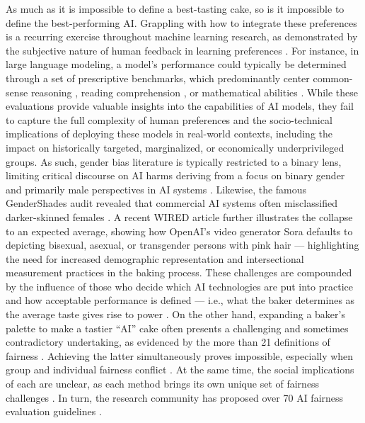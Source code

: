 \documentclass[manuscript,screen,authorversion,nonacm]{acmart}
\begin{document}
As much as it is impossible to define a best-tasting cake, so is it impossible to define the best-performing AI.
Grappling with how to integrate these preferences is a recurring exercise throughout machine learning research, as demonstrated by the subjective nature of human feedback in learning preferences \citep{kirk2024prism}.
For instance, in large language modeling, a model's performance could typically be determined through a set of prescriptive benchmarks, which predominantly center common-sense reasoning \cite{zellers2019hellaswag, ai2:winogrande, talmor-etal-2019-commonsenseqa}, reading comprehension \cite{rajpurkar-etal-2016-squad, clark2019boolq, choi-etal-2018-quac}, or mathematical abilities \cite{cobbe2021gsm8k,lightman2023lets}. 
While these evaluations provide valuable insights into the capabilities of AI models, they fail to capture the full complexity of human preferences and the socio-technical implications of deploying these models in real-world contexts, including the impact on historically targeted, marginalized, or economically underprivileged groups. As such, gender bias literature is typically restricted to a binary lens, limiting critical discourse on AI harms deriving from a focus on binary gender \cite{Queerinai2023, ovalle2024root} and primarily male perspectives in AI systems \cite{ovalle2023m, dev2021harms}.
Likewise, the famous GenderShades audit \cite{Buolamwini2018GenderShades} revealed that commercial AI systems often misclassified darker-skinned females \cite{Birhane2022UnseenBlackFaces}. A recent WIRED article \cite{Wired2024SoraQueer} further illustrates the collapse to an expected average, showing how OpenAI's video generator Sora \cite{OpenAI2024Sora} defaults to depicting bisexual, asexual, or transgender persons with pink hair --- highlighting the need for increased demographic representation and intersectional measurement practices in the baking process. These challenges are compounded by the influence of those who decide which AI technologies are put into practice and how acceptable performance is defined --- i.e., what the baker determines as the average taste gives rise to power \cite{Bommasani2022EvaluationChange}. On the other hand, expanding a baker's palette to make a tastier ``AI'' cake often presents a challenging and sometimes contradictory undertaking, as evidenced by the more than 21 definitions of fairness \cite{Narayanan2018Fairness21Def}. Achieving the latter simultaneously proves impossible, especially when group and individual fairness conflict \cite{Kleinberg2017FairnessImposibility, Binns2020FairnessConflict}. 
At the same time, the social implications of each are unclear, as each method brings its own unique set of fairness challenges \cite{Castelnovo2022FairenssNuances, Lum2022DebiasingBiasMeasurement}. 
In turn, the research community has proposed over 70 AI fairness evaluation guidelines \cite{Bellamy2019AIFairness360}. 
\end{document}
